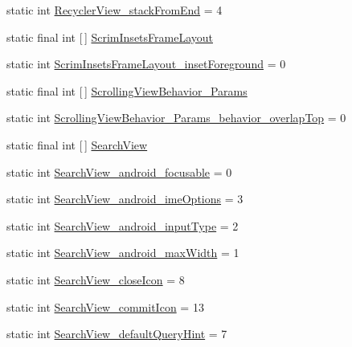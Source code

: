 \begin{DoxyCompactItemize}
\item 
static int \hyperlink{classandroid_1_1support_1_1design_1_1R_1_1styleable_aa31f22249f518fec353aa52e96d2985d}{Recycler\+View\+\_\+stack\+From\+End} = 4
\item 
static final int \mbox{[}$\,$\mbox{]} \hyperlink{classandroid_1_1support_1_1design_1_1R_1_1styleable_a95b90e25d1cb72b4321bb1e78f92f75b}{Scrim\+Insets\+Frame\+Layout}
\item 
static int \hyperlink{classandroid_1_1support_1_1design_1_1R_1_1styleable_a3a7ff73bbc7b3aeb5439022d90d08790}{Scrim\+Insets\+Frame\+Layout\+\_\+inset\+Foreground} = 0
\item 
static final int \mbox{[}$\,$\mbox{]} \hyperlink{classandroid_1_1support_1_1design_1_1R_1_1styleable_a89ee309ee8c19c6a7c6343663ef077b9}{Scrolling\+View\+Behavior\+\_\+\+Params}
\item 
static int \hyperlink{classandroid_1_1support_1_1design_1_1R_1_1styleable_a804332f610252049c725629df0cedcd9}{Scrolling\+View\+Behavior\+\_\+\+Params\+\_\+behavior\+\_\+overlap\+Top} = 0
\item 
static final int \mbox{[}$\,$\mbox{]} \hyperlink{classandroid_1_1support_1_1design_1_1R_1_1styleable_a8f7e72dc1bf854e14c1be7dbc1cb7392}{Search\+View}
\item 
static int \hyperlink{classandroid_1_1support_1_1design_1_1R_1_1styleable_a7ac28ac6ee547e469ab02402f744e213}{Search\+View\+\_\+android\+\_\+focusable} = 0
\item 
static int \hyperlink{classandroid_1_1support_1_1design_1_1R_1_1styleable_af9de3573ac6e0e2c6743858a629db9e5}{Search\+View\+\_\+android\+\_\+ime\+Options} = 3
\item 
static int \hyperlink{classandroid_1_1support_1_1design_1_1R_1_1styleable_ade6584fc0075b1b9f4eb7d962b817198}{Search\+View\+\_\+android\+\_\+input\+Type} = 2
\item 
static int \hyperlink{classandroid_1_1support_1_1design_1_1R_1_1styleable_ab62fc7eb5b7b2bc25ef503ebe25dc42b}{Search\+View\+\_\+android\+\_\+max\+Width} = 1
\item 
static int \hyperlink{classandroid_1_1support_1_1design_1_1R_1_1styleable_aa0a9fd15edd08df1deca5a77072d1fb5}{Search\+View\+\_\+close\+Icon} = 8
\item 
static int \hyperlink{classandroid_1_1support_1_1design_1_1R_1_1styleable_a9fa9a7e88b9b47cd40415ede8e02019d}{Search\+View\+\_\+commit\+Icon} = 13
\item 
static int \hyperlink{classandroid_1_1support_1_1design_1_1R_1_1styleable_a169926ffb29c292c78de7f9770a418e6}{Search\+View\+\_\+default\+Query\+Hint} = 7

\end{DoxyCompactItemize}
